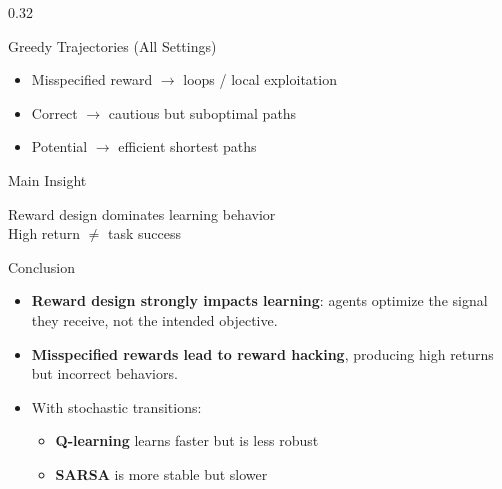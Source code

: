 \begin{frame}[t]
\begin{columns}[t]
\begin{column}{0.32\textwidth}
\begin{block}{Greedy Trajectories (All Settings)}
				\medskip

				\begin{itemize}
					\item Misspecified reward $\rightarrow$ loops / local exploitation
					\item Correct $\rightarrow$ cautious but suboptimal paths
					\item Potential $\rightarrow$ efficient shortest paths
				\end{itemize}

			\end{block}

			\begin{alertblock}{Main Insight}

				\begin{center}
					\Large
					Reward design dominates learning behavior \\
					\medskip
					High return $\neq$ task success
				\end{center}

			\end{alertblock}


			\begin{block}{Conclusion}

				\begin{itemize}

					\item \textbf{Reward design strongly impacts learning}: agents optimize the signal they receive, not the intended objective.

					\item \textbf{Misspecified rewards lead to reward hacking}, producing high returns but incorrect behaviors.

					\item With stochastic transitions:

					      \medskip

					      \begin{itemize}
						      \item \textbf{Q-learning} learns faster but is less robust

						            \medskip

						      \item \textbf{SARSA} is more stable but slower
					      \end{itemize}


\end{itemize}
\end{block}
\end{column}
\end{columns}
\end{frame}
